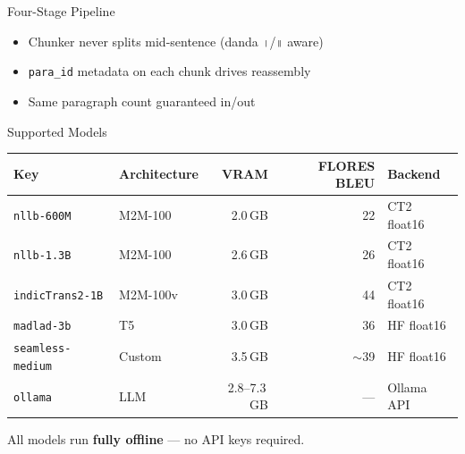 \documentclass[aspectratio=169,10pt]{beamer}
\begin{document}
\begin{frame}{Four-Stage Pipeline}
  \begin{center}
  \end{center}

  \begin{itemize}
    \item Chunker never splits mid-sentence (danda \texttt{।}/\texttt{॥} aware)
    \item \texttt{para\_id} metadata on each chunk drives reassembly
    \item Same paragraph count guaranteed in/out
  \end{itemize}
\end{frame}

\begin{frame}{Supported Models}
  \begin{table}
  \small
  \begin{tabular}{llrrl}
    \toprule
    Key & Architecture & VRAM & FLORES BLEU & Backend \\
    \midrule
    \texttt{nllb-600M}       & M2M-100  & 2.0\,GB & 22       & CT2 float16 \\
    \texttt{nllb-1.3B}       & M2M-100  & 2.6\,GB & 26       & CT2 float16 \\
    \texttt{indicTrans2-1B}  & M2M-100v & 3.0\,GB & 44       & CT2 float16 \\
    \texttt{madlad-3b}       & T5       & 3.0\,GB & 36       & HF float16  \\
    \texttt{seamless-medium} & Custom   & 3.5\,GB & $\sim$39 & HF float16  \\
    \texttt{ollama}          & LLM      & 2.8--7.3\,GB & ---  & Ollama API  \\
    \bottomrule
  \end{tabular}
  \end{table}
  All models run \textbf{fully offline} --- no API keys required.
\end{frame}
\end{document}
